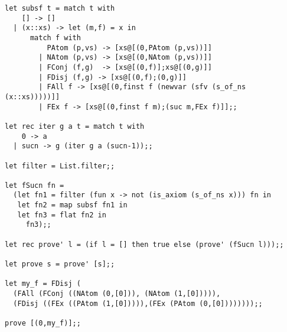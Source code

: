 \documentclass[11pt,a4paper]{article}
\begin{document}
\begin{verbatim}
let subsf t = match t with 
    [] -> []
  | (x::xs) -> let (m,f) = x in
      match f with 
          PAtom (p,vs) -> [xs@[(0,PAtom (p,vs))]]
        | NAtom (p,vs) -> [xs@[(0,NAtom (p,vs))]]
        | FConj (f,g)  -> [xs@[(0,f)];xs@[(0,g)]]
        | FDisj (f,g) -> [xs@[(0,f);(0,g)]]
        | FAll f -> [xs@[(0,finst f (newvar (sfv (s_of_ns (x::xs)))))]]
        | FEx f -> [xs@[(0,finst f m);(suc m,FEx f)]];;

let rec iter g a t = match t with
    0 -> a
  | sucn -> g (iter g a (sucn-1));;

let filter = List.filter;;

let fSucn fn = 
  (let fn1 = filter (fun x -> not (is_axiom (s_of_ns x))) fn in
   let fn2 = map subsf fn1 in
   let fn3 = flat fn2 in
     fn3);;

let rec prove' l = (if l = [] then true else (prove' (fSucn l)));;

let prove s = prove' [s];;

let my_f = FDisj (
  (FAll (FConj ((NAtom (0,[0])), (NAtom (1,[0])))),
  (FDisj ((FEx ((PAtom (1,[0])))),(FEx (PAtom (0,[0])))))));;

prove [(0,my_f)];;
\end{verbatim}



\end{document}
